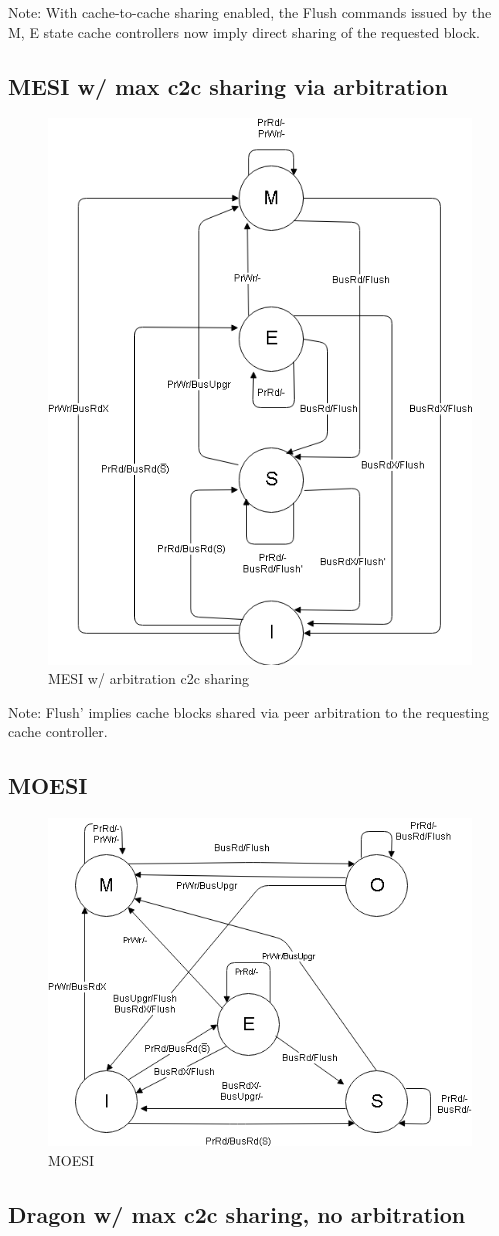 \documentclass[12pt, letterpaper]{report}
\begin{document}
Note: With cache-to-cache sharing enabled, the Flush commands issued by the M, E state cache controllers now imply direct sharing of the requested block.

\subsection{MESI w/ max c2c sharing via arbitration}

\begin{figure}[H]
	\centering
	\includegraphics[width=0.4\columnwidth]{mesi_c2c_arb.png}
	\caption{MESI w/ arbitration c2c sharing}
\end{figure}

Note: Flush' implies cache blocks shared via peer arbitration to the requesting cache controller.

\subsection{MOESI}

\begin{figure}[H]
	\centering
	\includegraphics[width=0.6\columnwidth]{moesi.png}
	\caption{MOESI}
\end{figure}

\subsection{Dragon w/ max c2c sharing, no arbitration}
\end{document}
